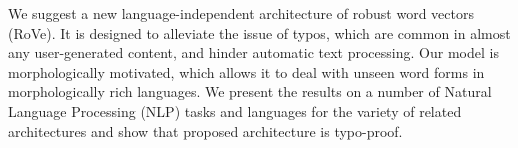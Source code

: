 We suggest a new language-independent architecture of robust word vectors (RoVe). It is designed to alleviate the issue of typos, which are common in almost any user-generated content, and hinder automatic text processing. Our model is morphologically motivated, which allows it to deal with unseen word forms in morphologically rich languages. We present the results on a number of Natural Language Processing (NLP) tasks and languages for the variety of related architectures and show that proposed architecture is typo-proof.
